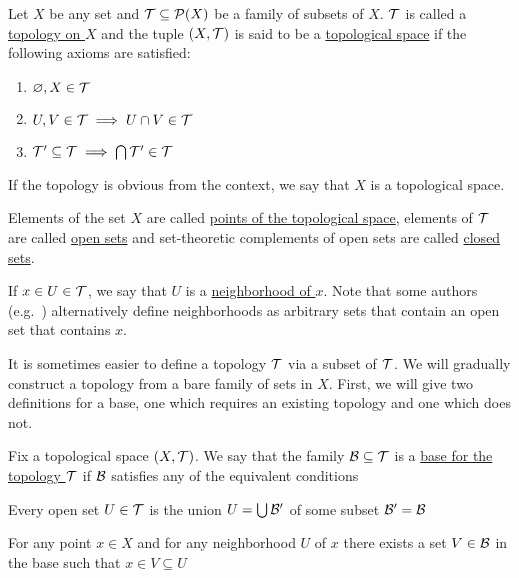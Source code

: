 \begin{definition}\label{def:topological_space}\cite[21]{Lectures:general_topology}
  Let $X$ be any set and $\mathcal T \subseteq \operatorname{\mathcal P}(X)$ be a family of subsets of $X$. $\mathcal T$ is called a \uline{topology on $X$} and the tuple $(X, \mathcal T)$ is said to be a \uline{topological space} if the following axioms are satisfied:
  \begin{enumerate}[label={\textbf{O\arabic*)}}]
    \item\label{def:topological_space/O1} $\varnothing, X \in \mathcal T$
    \item\label{def:topological_space/O2} $U, V \in \mathcal T \implies U \cap V \in \mathcal T$
    \item\label{def:topological_space/O3} $\mathcal T' \subseteq \mathcal T \implies \bigcap \mathcal T' \in \mathcal T$
  \end{enumerate}

  If the topology is obvious from the context, we say that $X$ is a topological space.

  Elements of the set $X$ are called \uline{points of the topological space}, elements of $\mathcal T$ are called \uline{open sets} and set-theoretic complements of open sets are called \uline{closed sets}.

  If $x \in U \in \mathcal T$, we say that $U$ is a \uline{neighborhood of $x$}. Note that some authors (e.g.~\cite[38]{Kelley1955}) alternatively define neighborhoods as arbitrary sets that contain an open set that contains $x$.
\end{definition}

It is sometimes easier to define a topology $\mathcal T$ via a subset of $\mathcal T$. We will gradually construct a topology from a bare family of sets in $X$. First, we will give two definitions for a base, one which requires an existing topology and one which does not.

\begin{definition}\label{def:topological_space_base}\cite[23]{Lectures:general_topology}
  Fix a topological space $(X, \mathcal T)$. We say that the family $\mathcal B \subseteq \mathcal T$ is a \uline{base for the topology $\mathcal T$} if $\mathcal B$ satisfies any of the equivalent conditions
  \begin{defenum}
    \item\label{def:topological_space_base/union} Every open set $U \in \mathcal T$ is the union $U = \bigcup \mathcal B'$ of some subset $\mathcal B' = \mathcal B$
    \item\label{def:topological_space_base/subset} For any point $x \in X$ and for any neighborhood $U$ of $x$ there exists a set $V \in \mathcal B$ in the base such that $x \in V \subseteq U$
  \end{defenum}
\end{definition}

